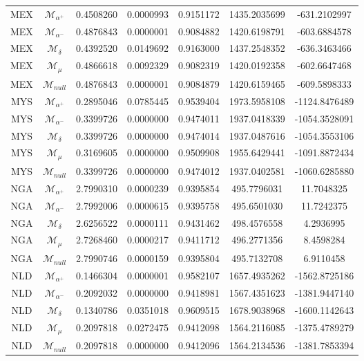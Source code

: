 \begin{tabular}{ccccccc}
MEX & $\mathcal{M}_{\alpha^+}$ & 0.4508260 & 0.0000993 & 0.9151172 & 1435.2035699 & -631.2102997\\
MEX & $\mathcal{M}_{\alpha^-}$ & 0.4876843 & 0.0000001 & 0.9084882 & 1420.6198791 & -603.6884578\\
MEX & $\mathcal{M}_{\delta}$ & 0.4392520 & 0.0149692 & 0.9163000 & 1437.2548352 & -636.3463466\\
MEX & $\mathcal{M}_{\mu}$ & 0.4866618 & 0.0092329 & 0.9082319 & 1420.0192358 & -602.6647468\\
MEX & $\mathcal{M}_{null}$ & 0.4876843 & 0.0000001 & 0.9084879 & 1420.6159465 & -609.5898333\\
MYS & $\mathcal{M}_{\alpha^+}$ & 0.2895046 & 0.0785445 & 0.9539404 & 1973.5958108 & -1124.8476489\\
MYS & $\mathcal{M}_{\alpha^-}$ & 0.3399726 & 0.0000000 & 0.9474011 & 1937.0418339 & -1054.3528091\\
MYS & $\mathcal{M}_{\delta}$ & 0.3399726 & 0.0000000 & 0.9474014 & 1937.0487616 & -1054.3553106\\
MYS & $\mathcal{M}_{\mu}$ & 0.3169605 & 0.0000000 & 0.9509908 & 1955.6429441 & -1091.8872434\\
MYS & $\mathcal{M}_{null}$ & 0.3399726 & 0.0000000 & 0.9474012 & 1937.0402581 & -1060.6285880\\
NGA & $\mathcal{M}_{\alpha^+}$ & 2.7990310 & 0.0000239 & 0.9395854 & 495.7796031 & 11.7048325\\
NGA & $\mathcal{M}_{\alpha^-}$ & 2.7992006 & 0.0000615 & 0.9395758 & 495.6501030 & 11.7242375\\
NGA & $\mathcal{M}_{\delta}$ & 2.6256522 & 0.0000111 & 0.9431462 & 498.4576558 & 4.2936995\\
NGA & $\mathcal{M}_{\mu}$ & 2.7268460 & 0.0000217 & 0.9411712 & 496.2771356 & 8.4598284\\
NGA & $\mathcal{M}_{null}$ & 2.7990746 & 0.0000159 & 0.9395804 & 495.7132708 & 6.9110458\\
NLD & $\mathcal{M}_{\alpha^+}$ & 0.1466304 & 0.0000001 & 0.9582107 & 1657.4935262 & -1562.8725186\\
NLD & $\mathcal{M}_{\alpha^-}$ & 0.2092032 & 0.0000000 & 0.9418981 & 1567.4351623 & -1381.9447140\\
NLD & $\mathcal{M}_{\delta}$ & 0.1340786 & 0.0351018 & 0.9609515 & 1678.9038968 & -1600.1142643\\
NLD & $\mathcal{M}_{\mu}$ & 0.2097818 & 0.0272475 & 0.9412098 & 1564.2116085 & -1375.4789279\\
NLD & $\mathcal{M}_{null}$ & 0.2097818 & 0.0000000 & 0.9412096 & 1564.2134536 & -1381.7853394\\

\end{tabular}
